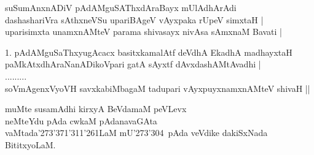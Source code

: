 \begin{entry}
\gl{}
\info{}{}{}{}
\begin{shl}
suSumAnxnADiV pAdAMguSAThxdAraBayx mUlAdhArAdi\\
dashashariVra sAthxneVSu upariBAgeV vAyxpaka rUpeV simxtaH |\\
uparisimxta unamxnAMteV  parama shivasayx nivAsa sAmxnaM Bavati |
\end{shl}
\begin{shl}
1. pAdAMguSaThxyugAcacx basitxkamalAtf deVdhA EkadhA madhayxtaH\\
paMkAtxdhAraNanADikoVpari gatA sAyxtf dAvxdashAMtAvadhi |\\
.........\\
soVmAgenxVyoVH savxkabiMbagaM tadupari vAyxpuyxnamxnAMteV shivaH ||
\end{shl}
\end{entry}

\begin{entry}
\gl{}
\end{entry}

\begin{entry}
\gl{}
\end{entry}

\begin{entry}
\gl{}
\begin{shl}
muMte susamAdhi kirxyA BeVdamaM peVLevx\\
neMteYdu pAda cwkaM pAdanavaGAta\\
vaMtada\char'273\char'371\char'311\char'261LaM
mU\char'273\char'304\ pAda veVdike dakiSxNada BititxyoLaM.
\end{shl}
\end{entry}

\begin{entry}
\end{entry}

